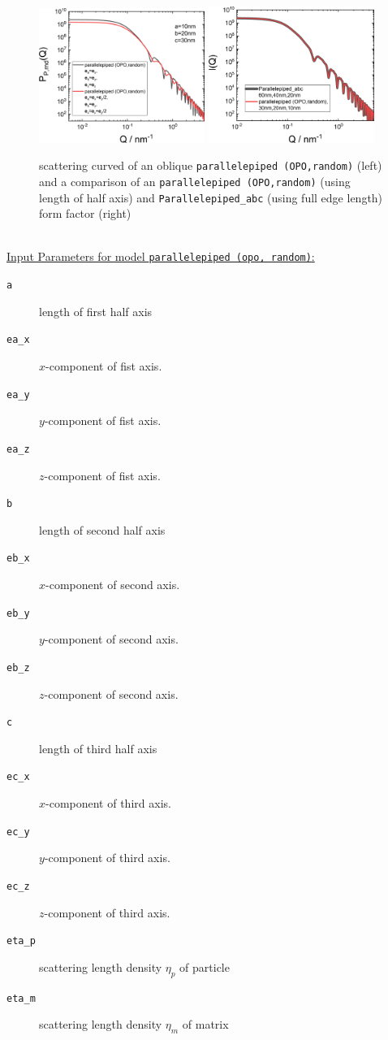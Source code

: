 \begin{figure}[htb]
\includegraphics[width=0.481\textwidth]{../images/form_factor/oriented_primitive_opbjects/parallelepipedOPOoblique.png} \hfill
\includegraphics[width=0.481\textwidth]{../images/form_factor/oriented_primitive_opbjects/parallelepipedOPOcompare.png}
\caption{scattering curved of an oblique \texttt{parallelepiped (OPO,random)} (left) and a comparison of an \texttt{parallelepiped (OPO,random)} (using length of half axis) and \texttt{Parallelepiped\_abc} (using full edge length) form factor (right)}
\label{fig:opo_ellipsoidIQrandom}
\end{figure}

~\\
\uline{Input Parameters for model \texttt{parallelepiped (opo, random)}:}
\begin{description}
\item[\texttt{a}] length of first half axis
\item[\texttt{ea\_x}] $x$-component of fist axis.
\item[\texttt{ea\_y}] $y$-component of fist axis.
\item[\texttt{ea\_z}] $z$-component of fist axis.
\item[\texttt{b}] length of second half axis
\item[\texttt{eb\_x}] $x$-component of second axis.
\item[\texttt{eb\_y}] $y$-component of second axis.
\item[\texttt{eb\_z}] $z$-component of second axis.
\item[\texttt{c}] length of third half axis
\item[\texttt{ec\_x}] $x$-component of third axis.
\item[\texttt{ec\_y}] $y$-component of third axis.
\item[\texttt{ec\_z}] $z$-component of third axis.
\item[\texttt{eta\_p}] scattering length density $\eta_p$ of particle
\item[\texttt{eta\_m}] scattering length density $\eta_m$ of matrix
\end{description}

